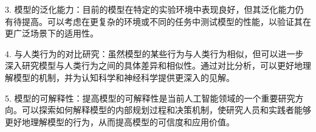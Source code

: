 \documentclass[UTF8,12pt]{article} %
\begin{document}
3. 模型的泛化能力：目前的模型在特定的实验环境中表现良好，但其泛化能力仍有待提高。可以考虑在更复杂的环境或不同的任务中测试模型的性能，以验证其在更广泛场景下的适用性。

4. 与人类行为的对比研究：虽然模型的某些行为与人类行为相似，但可以进一步深入研究模型与人类行为之间的具体差异和相似性。通过对比分析，可以更好地理解模型的机制，并为认知科学和神经科学提供更深入的见解。

5. 模型的可解释性：提高模型的可解释性是当前人工智能领域的一个重要研究方向。可以探索如何解释模型的内部规划过程和决策机制，使研究人员和实践者能够更好地理解模型的行为，从而提高模型的可信度和应用价值。



\end{document}
